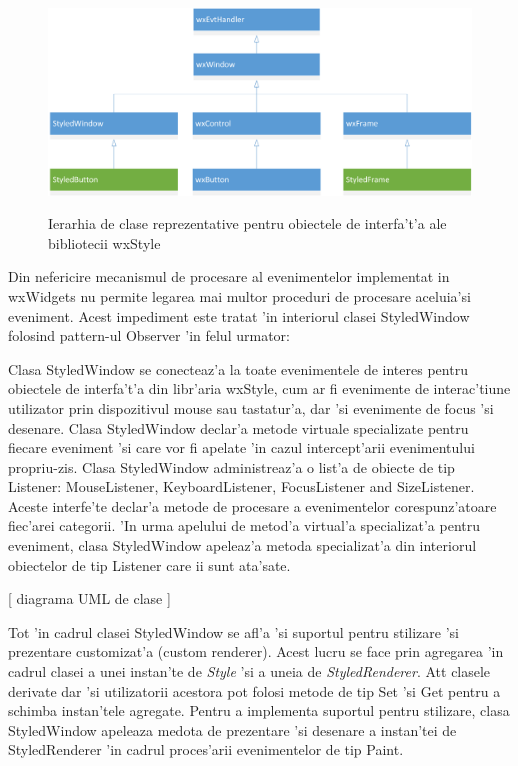 \begin{center}
\begin{figure}[h]
    \centering
    \includegraphics[scale=0.7]{img/ch5_class_system_architecture.png}
    \label{fig:ch5_class_system_architecture}
    \caption{Ierarhia de clase reprezentative pentru obiectele de interfa't'a ale bibliotecii wxStyle}
\end{figure}
\end{center}

Din nefericire mecanismul de procesare al evenimentelor implementat in wxWidgets nu permite legarea mai multor proceduri de procesare aceluia'si eveniment. Acest impediment este tratat 'in interiorul clasei StyledWindow folosind pattern-ul Observer 'in felul urmator:

\medskip

Clasa StyledWindow se conecteaz'a la toate evenimentele de interes pentru obiectele de interfa't'a din libr'aria wxStyle, cum ar fi evenimente de interac'tiune utilizator prin dispozitivul mouse sau tastatur'a, dar 'si evenimente de focus 'si desenare.
Clasa StyledWindow declar'a metode virtuale specializate pentru fiecare eveniment 'si care vor fi apelate 'in cazul intercept'arii evenimentului propriu-zis.
Clasa StyledWindow administreaz'a o list'a de obiecte de tip Listener: MouseListener, KeyboardListener, FocusListener and SizeListener. Aceste interfe'te declar'a metode de procesare a evenimentelor corespunz'atoare fiec'arei categorii. 'In urma apelului de metod'a virtual'a specializat'a pentru eveniment, clasa StyledWindow apeleaz'a metoda specializat'a din interiorul obiectelor de tip Listener care ii sunt ata'sate.

\medskip

[ diagrama UML de clase ]

\medskip

Tot 'in cadrul clasei StyledWindow se afl'a 'si suportul pentru stilizare 'si prezentare customizat'a (custom renderer). Acest lucru se face prin agregarea 'in cadrul clasei a unei instan'te de \emph{Style} 'si a uneia de \emph{StyledRenderer}. At{\ia}t clasele derivate dar 'si utilizatorii acestora pot folosi metode de tip Set 'si Get pentru a schimba instan'tele agregate. Pentru a implementa suportul pentru stilizare, clasa StyledWindow apeleaza medota de prezentare 'si desenare a instan'tei de StyledRenderer 'in cadrul proces'arii evenimentelor de tip Paint.

